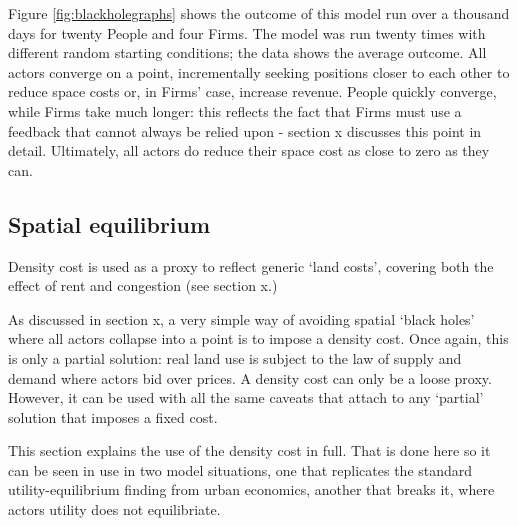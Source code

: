 Figure \ref{fig:blackholegraphs} shows the outcome of this model run over a thousand days for twenty People and four Firms. The model was run twenty times with different random starting conditions; the data shows the average outcome. All actors converge on a point, incrementally seeking positions closer to each other to reduce space costs or, in Firms' case, increase revenue. People quickly converge, while Firms take much longer: this reflects the fact that Firms must use a feedback that cannot always be relied upon - section x discusses this point in detail.  Ultimately, all actors do reduce their space cost as close to zero as they can.

\subsection{Spatial equilibrium}

Density cost is used as a proxy to reflect generic `land costs', covering both the effect of rent and congestion (see section x.) 

As discussed in section x, a very simple way of avoiding spatial `black holes' where all actors collapse into a point is to impose a density cost. Once again, this is only a partial solution: real land use is subject to the law of supply and demand where actors bid over prices. A density cost can only be a loose proxy. However, it can be used with all the same caveats that attach to any `partial' solution that imposes a fixed cost. 


This section explains the use of the density cost in full. That is done here so it can be seen in use in two model situations, one that replicates the standard utility-equilibrium finding from urban economics, another that breaks it, where actors utility does not equilibriate.

